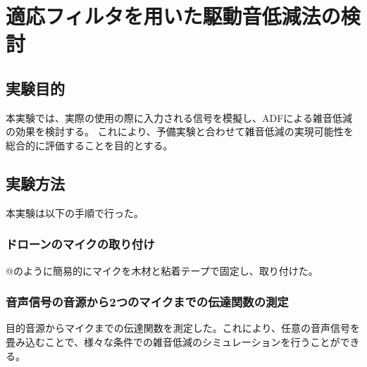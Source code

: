 \hypertarget{ux9069ux5fdcux30d5ux30a3ux30ebux30bfux3092ux7528ux3044ux305fux99c6ux52d5ux97f3ux4f4eux6e1bux6cd5ux306eux691cux8a0e}{%
\section{適応フィルタを用いた駆動音低減法の検討}\label{ux9069ux5fdcux30d5ux30a3ux30ebux30bfux3092ux7528ux3044ux305fux99c6ux52d5ux97f3ux4f4eux6e1bux6cd5ux306eux691cux8a0e}}

\hypertarget{ux5b9fux9a13ux76eeux7684}{%
\subsection{実験目的}\label{ux5b9fux9a13ux76eeux7684}}

本実験では、実際の使用の際に入力される信号を模擬し、ADFによる雑音低減の効果を検討する。
これにより、予備実験と合わせて雑音低減の実現可能性を総合的に評価することを目的とする。

\hypertarget{ux5b9fux9a13ux65b9ux6cd5}{%
\subsection{実験方法}\label{ux5b9fux9a13ux65b9ux6cd5}}

本実験は以下の手順で行った。

\hypertarget{ux30c9ux30edux30fcux30f3ux306eux30deux30a4ux30afux306eux53d6ux308aux4ed8ux3051}{%
\subsubsection{ドローンのマイクの取り付け}\label{ux30c9ux30edux30fcux30f3ux306eux30deux30a4ux30afux306eux53d6ux308aux4ed8ux3051}}

@のように簡易的にマイクを木材と粘着テープで固定し、取り付けた。

\hypertarget{ux97f3ux58f0ux4fe1ux53f7ux306eux97f3ux6e90ux304bux30892ux3064ux306eux30deux30a4ux30afux307eux3067ux306eux4f1dux9054ux95a2ux6570ux306eux6e2cux5b9a}{%
\subsubsection{音声信号の音源から2つのマイクまでの伝達関数の測定}\label{ux97f3ux58f0ux4fe1ux53f7ux306eux97f3ux6e90ux304bux30892ux3064ux306eux30deux30a4ux30afux307eux3067ux306eux4f1dux9054ux95a2ux6570ux306eux6e2cux5b9a}}

目的音源からマイクまでの伝達関数を測定した。これにより、任意の音声信号を畳み込むことで、様々な条件での雑音低減のシミュレーションを行うことができる。

